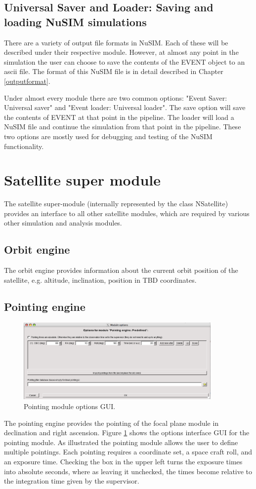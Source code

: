 \subsection{Universal Saver and Loader: Saving and loading NuSIM simulations}
There are a variety of output file formats in NuSIM. Each of these will be described under their respective module. However, at almost any point in the simulation the user can choose to save the contents of the EVENT object to an ascii file. The format of this NuSIM file is in detail described in Chapter \ref{outputformat}. 

Under almost every module there are two common options: "Event Saver: Universal saver" and "Event loader: Universal loader". The save option will save the contents of EVENT at that point in the pipeline. The loader will load a NuSIM file and continue the simulation from that point in the pipeline. These two options are mostly used for debugging and testing of the NuSIM functionality.

\section{Satellite super module}\label{ssm}
The satellite super-module (internally represented by the class NSatellite) provides an interface to all other satellite modules, which are required by various other simulation and analysis modules.
\subsection{Orbit engine}
The orbit engine provides information about the current orbit position of the satellite, e.g. altitude, inclination, position in TBD coordinates.

\subsection{Pointing engine}
\begin{figure}[bt]
\begin{center}
\includegraphics[width=10cm]{images/pointingGUI.png}  
\caption{Pointing module options GUI.}
\label{pointinggui} 
\end{center}
\end{figure}
The pointing engine provides the pointing of the focal plane module in declination and right ascension. Figure \ref{pointinggui} shows the options interface GUI for the pointing module. As illustrated the pointing module allows the user to define multiple pointings. Each pointing requires a coordinate set, a space craft roll, and an exposure time. Checking the box in the upper left turns the exposure times into absolute seconds, where as leaving it unchecked, the times become relative to the integration time given by the supervisor.

